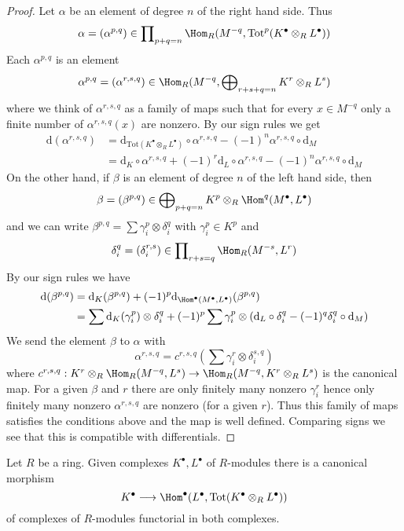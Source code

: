 \begin{proof}
Let $\alpha$ be an element of degree $n$ of the right hand side.
Thus
$$
\alpha = (\alpha^{p, q}) \in \prod\nolimits_{p + q = n}
\Hom_R(M^{-q}, \text{Tot}^p(K^\bullet \otimes_R L^\bullet))
$$
Each $\alpha^{p, q}$ is an element
$$
\alpha^{p, q} = (\alpha^{r, s, q}) \in
\Hom_R(M^{-q}, \bigoplus\nolimits_{r + s + q = n} K^r \otimes_R L^s)
$$
where we think of $\alpha^{r, s, q}$ as a family of maps such that
for every $x \in M^{-q}$ only a finite number of
$\alpha^{r, s, q}(x)$ are nonzero. By our sign rules we get
\begin{align*}
\text{d}(\alpha^{r, s, q})
& =
\text{d}_{\text{Tot}(K^\bullet \otimes_R L^\bullet)} \circ \alpha^{r, s, q}
- (-1)^n \alpha^{r, s, q} \circ \text{d}_M \\
& =
\text{d}_K \circ \alpha^{r, s, q} + (-1)^r \text{d}_L \circ \alpha^{r, s, q}
- (-1)^n \alpha^{r, s, q} \circ \text{d}_M
\end{align*}
On the other hand, if $\beta$ is an element of degree $n$ of the
left hand side, then
$$
\beta = (\beta^{p, q}) \in
\bigoplus\nolimits_{p + q = n} K^p \otimes_R \Hom^q(M^\bullet, L^\bullet)
$$
and we can write $\beta^{p, q} = \sum \gamma_i^p \otimes \delta_i^q$ with
$\gamma_i^p \in K^p$ and
$$
\delta_i^q = (\delta_i^{r, s}) \in
\prod\nolimits_{r + s = q} \Hom_R(M^{-s}, L^r)
$$
By our sign rules we have
\begin{align*}
\text{d}(\beta^{p, q})
& =
\text{d}_K(\beta^{p, q}) +
(-1)^p \text{d}_{\Hom^\bullet(M^\bullet, L^\bullet)}(\beta^{p, q}) \\
& =
\sum \text{d}_K(\gamma_i^p) \otimes \delta_i^q +
(-1)^p \sum \gamma_i^p \otimes
(\text{d}_L \circ \delta_i^q - (-1)^q \delta_i^q \circ \text{d}_M)
\end{align*}
We send the element $\beta$ to $\alpha$ with
$$
\alpha^{r, s, q} = c^{r, s, q}(\sum \gamma_i^r \otimes \delta_i^{s, q})
$$
where $c^{r, s, q} : K^r \otimes_R \Hom_R(M^{-q}, L^s) \to
\Hom_R(M^{-q}, K^r \otimes_R L^s)$ is the canonical map.
For a given $\beta$ and $r$ there are only finitely many nonzero
$\gamma_i^r$ hence only finitely many nonzero $\alpha^{r, s, q}$
are nonzero (for a given $r$). Thus this family of maps satisfies
the conditions above and the map is well defined.
Comparing signs we see that this is compatible with differentials.
\end{proof}

\begin{lemma}
\label{lemma-diagonal}
Let $R$ be a ring. Given complexes $K^\bullet, L^\bullet$
of $R$-modules there is a canonical morphism
$$
K^\bullet
\longrightarrow
\Hom^\bullet(L^\bullet, \text{Tot}(K^\bullet \otimes_R L^\bullet))
$$
of complexes of $R$-modules functorial in both complexes.
\end{lemma}

